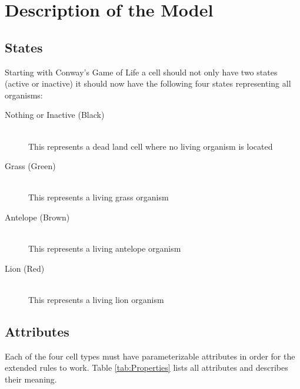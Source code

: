 \documentclass[11pt]{article}
\begin{document}
\section{Description of the Model}
\subsection{States}
Starting with Conway's Game of Life \cite{gameOfLife} a cell should not only have two states (active or inactive) it should now have the following four states representing all organisms:

\begin{description}
  \item[Nothing or Inactive (Black)] \hfill \\
	This represents a dead land cell where no living organism is located
  \item[Grass (Green)] \hfill \\
	This represents a living grass organism
  \item[Antelope (Brown)]  \hfill \\
	This represents a living antelope organism
  \item[Lion (Red)] 
   \hfill \\This represents a living lion organism
\end{description}

\subsection{Attributes}
Each of the four cell types must have parameterizable attributes in order for the extended rules to work. 
Table \ref{tab:Properties} lists all attributes and describes their meaning.
\end{document}
